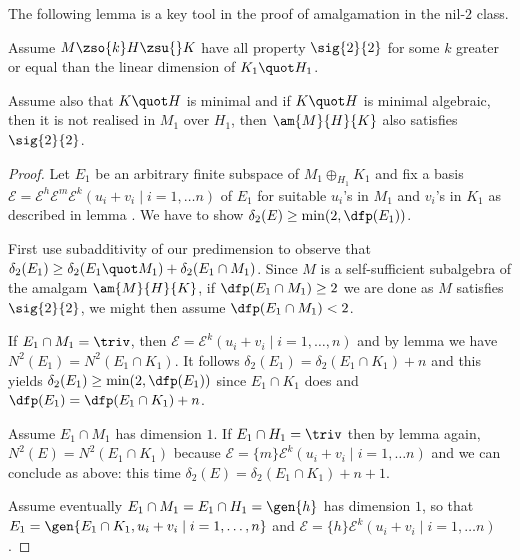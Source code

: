 \medskip
The following lemma is a key tool in the proof of amalgamation
in the nil-$2$ class. %
\begin{lem}\label{amalsigma2}
Assume $M\zso{k}H\zsu{} K$ have all property $\sig{2}{2}$ for some $k$
greater or equal than the linear dimension of $K_{1}\quot H_{1}$.

Assume also that $K\quot H$ is minimal and if $K\quot H$ is minimal algebraic, then it
is not realised in $M_{1}$ over $H_{1}$,
then $\am{M}{H}{K}$ also satisfies $\sig{2}{2}$.
\end{lem}
\begin{proof}
Let $E_{1}$ be an arbitrary finite subspace of $M_{1}\oplus_{H_{1}}K_{1}$ and fix a 
basis $\mathcal{E}=\mathcal{E}^{h}\mathcal{E}^{m}\mathcal{E}^{k}(
u_{i}+v_{i}\mid i=1,\dots n)$ of $E_{1}$ for suitable
$u_{i}$'s in $M_{1}$ and $v_{i}$'s in $K_{1}$ as described in lemma .
We have to show $\delta_{2}(E)\geq\min(2,\dfp(E_{1}))$.

First use subadditivity of our predimension to observe that $\delta_{2}(E_{1})\geq\delta_{2}(E_{1}\quot M_{1})+\delta_{2}(E_{1}\cap M_{1})$.
Since $M$ is a self-sufficient subalgebra of the amalgam $\am{M}{H}{K}$, if $\dfp(E_{1}\cap M_{1})\geq2$ we are done
as $M$ satisfies $\sig{2}{2}$, we might then assume $\dfp(E_{1}\cap M_{1})<2$.

\smallskip
If $E_{1}\cap M_{1}=\triv$,
then %
$\mathcal{E}=\mathcal{E}^{k}(u_{i}+v_{i}\mid i=1,\dots, n)$ and by lemma
 we have $N^{2}(E_{1})=%
N^{2}(E_{1}\cap K_{1})$.
It follows $\delta_{2}(E_{1})=\delta_{2}(E_{1}\cap K_{1})+n$ and
this yields $\delta_{2}(E_{1})\geq\min(2,\dfp(E_{1}))$ since $E_{1}\cap K_{1}$ does
and $\dfp(E_{1})=\dfp(E_{1}\cap K_{1})+n$.

\smallskip
Assume $E_{1}\cap M_{1}$ %
has dimension $1$. If $E_{1}\cap H_{1}=\triv$ then by lemma  again, $N^{2}(E)=N^{2}(E_{1}\cap
K_{1})$ because $\mathcal{E}=\{m\}\mathcal{E}^{k}(u_{i}+v_{i}\mid i=1,\dots n)$
and we can conclude as above: this time $\delta_{2}(E)=\delta_{2}(E_{1}\cap K_{1})+n+1$.

\medskip
Assume eventually $E_{1}\cap M_{1}=E_{1}\cap H_{1}=\gen{h}$ has dimension $1$, so that
$E_{1}=\gen{E_{1}\cap K_{1},u_{i}+v_{i}\mid i=1,\dots,n}$ and $\mathcal{E}=\{h\}\mathcal{E}^{k}(u_{i}+v_{i}\mid i=1,\dots n)$.


\end{proof}
